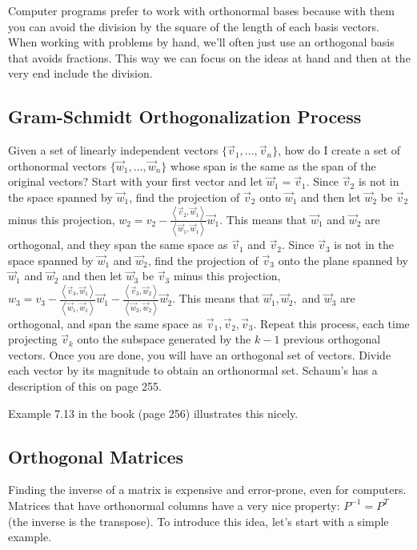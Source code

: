 Computer programs prefer to work with orthonormal bases because with them you can avoid the division by the square of the length of each basis vectors.  When working with problems by hand, we'll often just use an orthogonal basis that avoids fractions.  This way we can focus on the ideas at hand and then at the very end include the division.

\subsection{Gram-Schmidt Orthogonalization Process}


Given a set of linearly independent vectors $\{\vec v_1,\ldots,\vec v_n\}$, how do I create a set of orthonormal vectors $\{\vec w_1,\ldots,\vec w_n\}$ whose span is the same as the span of the original vectors?  Start with your first vector and let $\vec w_1 = \vec v_1$.  Since $\vec v_2$ is not in the space spanned by $\vec w_1$, find the projection of $\vec v_2$ onto $\vec w_1$ and then let $\vec w_2$ be $\vec v_2$ minus this projection, $w_2 = v_2 - \frac{\left<\vec v_2,\vec w_1\right>}{\left<\vec w_1,\vec w_1\right>}\vec w_1.$ This means that $\vec w_1$ and $\vec w_2$ are orthogonal, and they span the same space as $\vec v_1$ and $\vec v_2$.  Since $\vec v_3$ is not in the space spanned by $\vec w_1$ and $\vec w_2$, find the projection of $\vec v_3$ onto the plane spanned by $\vec w_1$ and $\vec w_2$ and then let $\vec w_3$ be $\vec v_3$ minus this projection, 
$w_3 = v_3 
- \frac{\left<\vec v_3,\vec w_1\right>}{\left<\vec w_1,\vec w_1\right>}\vec w_1
- \frac{\left<\vec v_3,\vec w_2\right>}{\left<\vec w_2,\vec w_2\right>}\vec w_2.$ This means that $\vec w_1, \vec w_2,$ and $\vec w_3$ are orthogonal, and span the same space as $\vec v_1, \vec v_2, \vec v_3$.  Repeat this process, each time projecting $\vec v_k$ onto the subspace generated by the $k-1$ previous orthogonal vectors.  Once you are done, you will have an orthogonal set of vectors.  Divide each vector by its magnitude to obtain an orthonormal set.  Schaum's has a description of this on page 255.


\begin{example}
Example 7.13 in the book (page 256) illustrates this nicely.
\end{example}


\subsection{Orthogonal Matrices}
Finding the inverse of a matrix is expensive and error-prone, even for computers.  Matrices that have orthonormal columns have a very nice property: $P^{-1} = P^T$ (the inverse is the transpose). To introduce this idea, let's start with a simple example.

